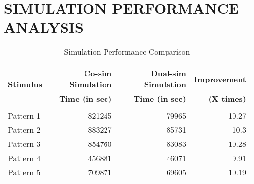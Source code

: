 \section{SIMULATION PERFORMANCE ANALYSIS}
\begin{table}[h!]
\begin{center}
\caption{Simulation Performance Comparison}
\label{tab:Simulation Performance}
\vspace{0.2cm}
\begin{tabular}{|l|r|r|r|}
\hline
\multirow{3}{*}{\bf Stimulus} & &	&\\ & {\bf Co-sim Simulation} 	& {\bf Dual-sim Simulation} & {\bf Improvement } 	\\ & {\bf Time (in sec)}  &  {\bf Time (in sec)} &  {\bf(X times) }\\



						&				&				&				\\
\hline
Pattern 1 			&821245				&79965				&10.27 				\\
Pattern 2  				&883227				&85731				&10.3 				\\

Pattern 3  		&854760				&83083				&10.28				\\

Pattern 4  			&456881				&46071 				&9.91				\\

Pattern 5  				&709871				&69605				&10.19				\\
\hline


\end{tabular}
\end{center}

\end{table}



